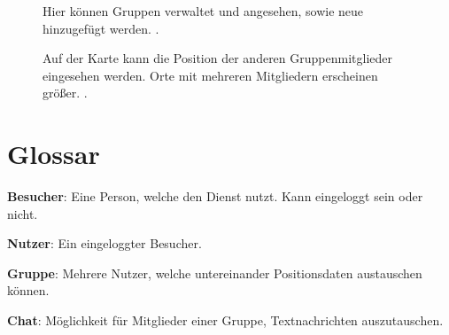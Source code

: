 \documentclass[parskip=full,11pt]{scrartcl}
\begin{document}
\begin{figure}[hb]
	\caption{\label{fig:groups}
		Hier können Gruppen verwaltet und angesehen, sowie neue hinzugefügt werden.
		.
	}
\end{figure}

\begin{figure}[hb]
		\caption{\label{fig:map}
			Auf der Karte kann die Position der anderen Gruppenmitglieder eingesehen werden.
			Orte mit mehreren Mitgliedern erscheinen größer.
			.
		}
\end{figure}

\section{Glossar}

\textbf{Besucher}:
Eine Person, welche den Dienst nutzt.
Kann eingeloggt sein oder nicht.

\textbf{Nutzer}:
Ein eingeloggter Besucher.

\textbf{Gruppe}:
Mehrere Nutzer, welche untereinander Positionsdaten austauschen können.

\textbf{Chat}:
Möglichkeit für Mitglieder einer Gruppe, Textnachrichten auszutauschen.
\end{document}
